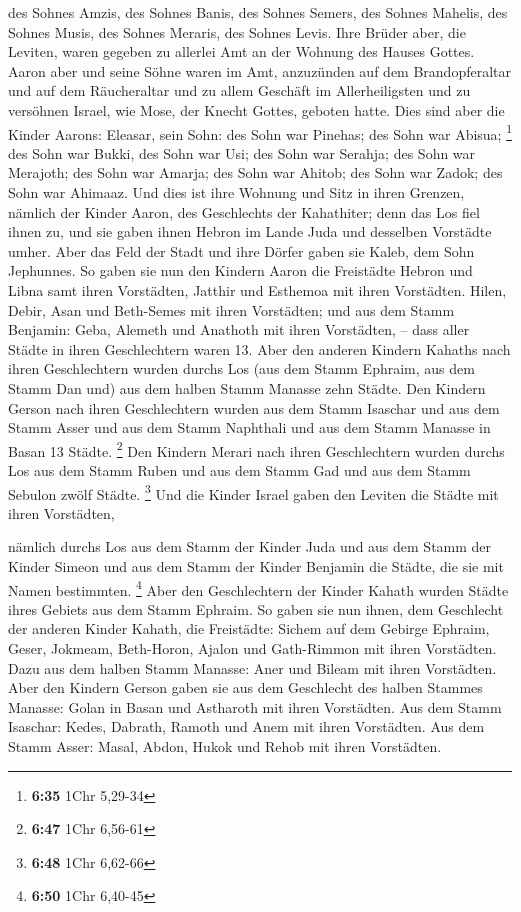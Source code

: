  des Sohnes Amzis, des Sohnes Banis, des Sohnes Semers,
 des Sohnes Mahelis, des Sohnes Musis, des Sohnes Meraris,
des Sohnes Levis.  Ihre Brüder aber, die Leviten, waren
gegeben zu allerlei Amt an der Wohnung des Hauses Gottes. 
Aaron aber und seine Söhne waren im Amt, anzuzünden auf dem
Brandopferaltar und auf dem Räucheraltar und zu allem Geschäft im
Allerheiligsten und zu versöhnen Israel, wie Mose, der Knecht Gottes,
geboten hatte.  Dies sind aber die Kinder Aarons: Eleasar,
sein Sohn: des Sohn war Pinehas; des Sohn war Abisua; \footnote{\textbf{6:35}
  1Chr 5,29-34}  des Sohn war Bukki, des Sohn war Usi; des
Sohn war Serahja;  des Sohn war Merajoth; des Sohn war
Amarja; des Sohn war Ahitob;  des Sohn war Zadok; des Sohn
war Ahimaaz.  Und dies ist ihre Wohnung und Sitz in ihren
Grenzen, nämlich der Kinder Aaron, des Geschlechts der Kahathiter; denn
das Los fiel ihnen zu,  und sie gaben ihnen Hebron im Lande
Juda und desselben Vorstädte umher.  Aber das Feld der
Stadt und ihre Dörfer gaben sie Kaleb, dem Sohn Jephunnes. 
So gaben sie nun den Kindern Aaron die Freistädte Hebron und Libna samt
ihren Vorstädten, Jatthir und Esthemoa mit ihren Vorstädten.
 Hilen, Debir,  Asan und Beth-Semes mit ihren
Vorstädten;  und aus dem Stamm Benjamin: Geba, Alemeth und
Anathoth mit ihren Vorstädten, -- dass aller Städte in ihren
Geschlechtern waren 13.  Aber den anderen Kindern Kahaths
nach ihren Geschlechtern wurden durchs Los (aus dem Stamm Ephraim, aus
dem Stamm Dan und) aus dem halben Stamm Manasse zehn Städte.
 Den Kindern Gerson nach ihren Geschlechtern wurden aus dem
Stamm Isaschar und aus dem Stamm Asser und aus dem Stamm Naphthali und
aus dem Stamm Manasse in Basan 13 Städte. \footnote{\textbf{6:47} 1Chr
  6,56-61}  Den Kindern Merari nach ihren Geschlechtern
wurden durchs Los aus dem Stamm Ruben und aus dem Stamm Gad und aus dem
Stamm Sebulon zwölf Städte. \footnote{\textbf{6:48} 1Chr 6,62-66}
 Und die Kinder Israel gaben den Leviten die Städte mit
ihren Vorstädten,

 nämlich durchs Los aus dem Stamm der Kinder Juda und aus
dem Stamm der Kinder Simeon und aus dem Stamm der Kinder Benjamin die
Städte, die sie mit Namen bestimmten. \footnote{\textbf{6:50} 1Chr
  6,40-45}  Aber den Geschlechtern der Kinder Kahath wurden
Städte ihres Gebiets aus dem Stamm Ephraim.  So gaben sie
nun ihnen, dem Geschlecht der anderen Kinder Kahath, die Freistädte:
Sichem auf dem Gebirge Ephraim, Geser,  Jokmeam,
Beth-Horon,  Ajalon und Gath-Rimmon mit ihren Vorstädten.
 Dazu aus dem halben Stamm Manasse: Aner und Bileam mit
ihren Vorstädten.  Aber den Kindern Gerson gaben sie aus
dem Geschlecht des halben Stammes Manasse: Golan in Basan und Astharoth
mit ihren Vorstädten.  Aus dem Stamm Isaschar: Kedes,
Dabrath,  Ramoth und Anem mit ihren Vorstädten.
 Aus dem Stamm Asser: Masal, Abdon,  Hukok und
Rehob mit ihren Vorstädten.

